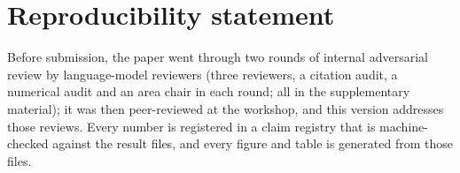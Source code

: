 \documentclass{article}
\begin{document}



\appendix
\raggedbottom
\section{Reproducibility statement}
\label{app:repro}
Before submission, the paper went through two rounds of internal adversarial review by language-model reviewers (three reviewers, a citation audit, a numerical audit and an area chair in each round; all in the supplementary material); it was then peer-reviewed at the workshop, and this version addresses those reviews. Every number is registered in a claim registry that is machine-checked against the result files, and every figure and table is generated from those files.
\end{document}
